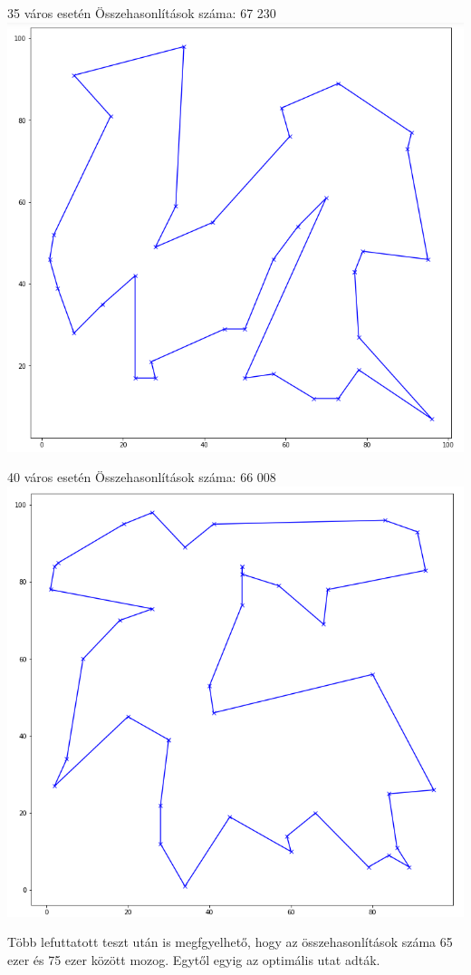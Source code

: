 35 város esetén
Összehasonlítások száma: 67 230
\includegraphics[scale=0.4]{images/35.png}

40 város esetén
Összehasonlítások száma: 66 008
\includegraphics[scale=0.4]{images/40.png}

Több lefuttatott teszt után is megfgyelhető, hogy az összehasonlítások száma 65 ezer és 75 ezer között mozog. Egytől egyig az optimális utat adták.
